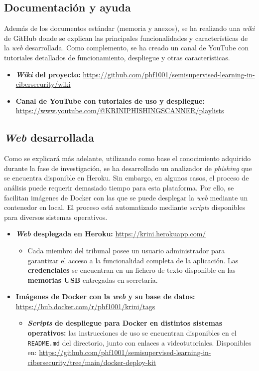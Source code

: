 \subsection{Documentación y ayuda}

Además de los documentos estándar (memoria y anexos), se ha realizado una \textit{wiki} de GitHub donde se explican las principales funcionalidades y características de la \textit{web} desarrollada. Como complemento, se ha creado un canal de YouTube con tutoriales detallados de funcionamiento, despliegue y otras características.

\begin{itemize}
	\item \textbf{\textit{Wiki} del proyecto:} 	\url{https://github.com/phf1001/semisupervised-learning-in-cibersecurity/wiki}
	\item \textbf{Canal de YouTube con tutoriales de uso y despliegue:} \url{https://www.youtube.com/@KRINIPHISHINGSCANNER/playlists}
\end{itemize}


\subsection{\textit{Web} desarrollada}

Como se explicará más adelante, utilizando como base el conocimiento adquirido durante la fase de investigación, se ha desarrollado un analizador de \textit{phishing} que se encuentra disponible en Heroku. Sin embargo, en algunos casos, el proceso de análisis puede requerir demasiado tiempo para esta plataforma. Por ello, se facilitan imágenes de Docker con las que se puede desplegar la \textit{web} mediante un contenedor en local. El proceso está automatizado mediante \textit{scripts} disponibles para diversos sistemas operativos.

\begin{itemize}
	\item \textbf{\textit{Web} desplegada en Heroku:} \url{https://krini.herokuapp.com/}
	\begin{itemize}
		\item Cada miembro del tribunal posee un usuario administrador para garantizar el acceso a la funcionalidad completa de la aplicación. Las \textbf{credenciales} se encuentran en un fichero de texto disponible en las \textbf{memorias USB} entregadas en secretaría.
	\end{itemize}
	\item \textbf{Imágenes de Docker con la \textit{web} y su base de datos:} \url{https://hub.docker.com/r/phf1001/krini/tags}
	\begin{itemize}
		\item \textbf{\textit{Scripts} de despliegue para Docker en distintos sistemas operativos:} las instrucciones de uso se encuentran disponibles en el \texttt{README.md} del directorio, junto con enlaces a videotutoriales. Disponibles en: \url{https://github.com/phf1001/semisupervised-learning-in-cibersecurity/tree/main/docker-deploy-kit}
	\end{itemize}

\end{itemize}